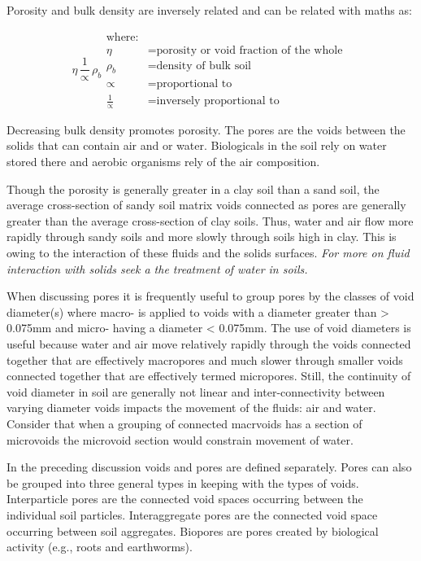 \documentclass[letterpaper, 12pt]{article}
\begin{document}
Porosity and bulk density are inversely related and can be related with maths as:

\begin{equation}
    \eta \, \frac{1}{\propto} \, \rho_b
    \begin{aligned}
        \text{where:}                                          \\
        \eta &= \text{porosity or void fraction of the whole } \\
        \rho_b &= \text{density of bulk soil}                  \\
        \propto &= \text{proportional to}                      \\
        \frac{1}{\propto} &= \text{inversely proportional to}
    \end{aligned}
\end{equation}

Decreasing bulk density promotes porosity. The pores are the voids between the solids that can contain air and or water. Biologicals in the soil rely on water stored there and aerobic organisms rely of the air composition.

Though the porosity is generally greater in a clay soil than a sand soil, the average cross-section of sandy soil matrix voids connected as pores are generally greater than the average cross-section of clay soils. Thus, water and air flow more rapidly through sandy soils and more slowly through soils high in clay. This is owing to the interaction of these fluids and the solids surfaces. \textit{For more on fluid interaction with solids seek a the treatment of water in soils.}

When discussing pores it is frequently useful to group pores by the classes of void diameter(s) where macro- is applied to voids with a diameter greater than \num{> 0.075}{mm} and micro- having a diameter \num{< 0.075}{mm}. The use of void diameters is useful because water and air move relatively rapidly through the voids connected together that are effectively macropores and much slower through smaller voids connected together that are effectively termed micropores. Still, the continuity of void diameter in soil are generally not linear and inter-connectivity between varying diameter voids impacts the movement of the fluids: air and water. Consider that when a grouping of connected macrvoids has a section of microvoids the microvoid section would constrain movement of water.

In the preceding discussion voids and pores are defined separately. Pores can also be grouped into three general types in keeping with the types of voids. Interparticle pores are the connected void spaces occurring between the individual soil particles. Interaggregate pores are the connected void space occurring between soil aggregates. Biopores are pores created by biological activity (e.g., roots and earthworms).
\end{document}

